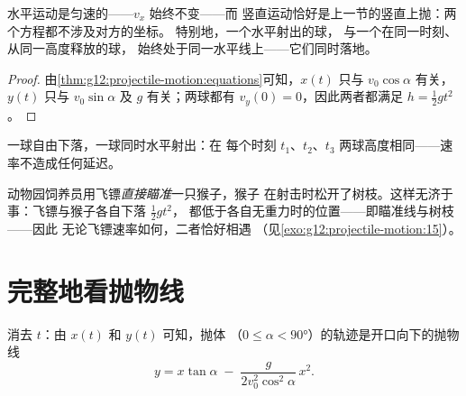 \begin{proposition}[两种运动的独立性]\label{prop:g12:projectile-motion:independence}
水平运动是匀速的——$v_x$ 始终不变——而
竖直运动恰好是上一节的竖直上抛：两个方程都不涉及对方的坐标。
特别地，一个水平射出的球，
与一个在同一时刻、从同一高度释放的球，
始终处于同一水平线上——它们同时落地。
\end{proposition}

\begin{proof}
由\cref{thm:g12:projectile-motion:equations}可知，$x(t)$ 只与
$v_0\cos\alpha$ 有关，$y(t)$ 只与 $v_0\sin\alpha$ 及 $g$ 有关；两球都有
$v_y(0) = 0$，因此两者都满足 $h = \tfrac12 gt^2$。
\end{proof}

\begin{omfigure}

{\small 一球自由下落，一球同时水平射出：在
每个时刻 $t_1$、$t_2$、$t_3$ 两球高度相同——速率不造成任何延迟。}
\end{omfigure}

\begin{remark}[下落的猴子]\label{rem:g12:projectile-motion:monkey}
动物园饲养员用飞镖\emph{直接瞄准}一只猴子，猴子
在射击时松开了树枝。这样无济于事：飞镖与猴子各自下落 $\tfrac12 gt^2$，
都低于各自无重力时的位置——即瞄准线与树枝——因此
无论飞镖速率如何，二者恰好相遇
（见\cref{exo:g12:projectile-motion:15}）。
\end{remark}

\section{完整地看抛物线}

\begin{theorem}[轨迹]\label{thm:g12:projectile-motion:trajectory}
消去 $t$：由 $x(t)$ 和 $y(t)$ 可知，抛体
（$0 \leq \alpha < \ang{90}$）的轨迹是开口向下的抛物线
\[
y = x\tan\alpha \;-\; \frac{g}{2 v_0^2 \cos^2\alpha}\, x^2 .
\]
\end{theorem}

